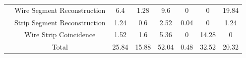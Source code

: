 \begin{table}[]
\begin{tabular}{|c|c|c|c|c|c|c|c|}
                                                                                & Wire Segment Reconstruction  & 6.4                                                       & 1.28                                                      & 9.6                                                      & 0                                                                 & 0                                                      & 19.84                                                  \\ \cline{2-8} 
                                                                                & Strip Segment Reconstruction & 1.24                                                      & 0.6                                                       & 2.52                                                     & 0.04                                                              & 0                                                      & 1.24                                                   \\ \cline{2-8} 
                                                                                & Wire Strip Coincidence       & 1.52                                                      & 1.6                                                       & 5.36                                                     & 0                                                                 & 14.28                                                  & 0                                                      \\ \cline{2-8} 
                                                                                & Total                        & 25.84                                                     & 15.88                                                     & 52.04                                                    & 0.48                                                              & 32.52                                                  & 20.32                                                  \\ \hline
    \end{tabular}
\end{table}

